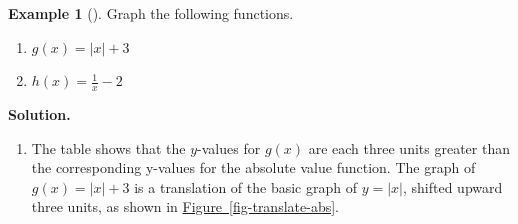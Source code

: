 \documentclass[10pt,]{book}
\theoremstyle{plain}
\theoremstyle{definition}
\theoremstyle{definition}
\theoremstyle{definition}
\newtheorem{example}[theorem]{Example}
\theoremstyle{definition}
\theoremstyle{definition}
\numberwithin{equation}{section}
\newcommand{\hrulethin}  {\noalign{\hrule height 0.04em}}
\newcommand{\hrulethick} {\noalign{\hrule height 0.11em}}
\newcounter{figstack}
\newlength\fight
\newcommand\pushValignCaptionBottom[5][b]{%
\stepcounter{figstack}%
\expandafter\def\csname %
figalign\romannumeral\value{figstack}\endcsname{#1}%
\expandafter\def\csname %
figtype\romannumeral\value{figstack}\endcsname{#2}%
\expandafter\def\csname %
figwd\romannumeral\value{figstack}\endcsname{#3}%
\expandafter\def\csname %
figcontent\romannumeral\value{figstack}\endcsname{#4}%
\expandafter\def\csname %
figcap\romannumeral\value{figstack}\endcsname{#5}%
\setbox0=\hbox{%
\begin{#2}{#3}#4\end{#2}}%
\ifdim\dimexpr\ht0+\dp0\relax>\fight\global\setlength{\fight}{%
\dimexpr\ht0+\dp0\relax}\fi%
}
\newcommand\abs[1]{\left|#1\right|}
\begin{document}
%
\begin{example}[]\label{example-translations}
Graph the following functions.
        \leavevmode%
\begin{enumerate}[label=*\alph**]
\item\hypertarget{li-288}{}\(g(x) = \abs{x} + 3\)\item\hypertarget{li-289}{}\(h(x) = \frac{1}{x}− 2\)\end{enumerate}

\par\medskip\noindent%
\textbf{Solution.}\quad \leavevmode%
\begin{enumerate}[label=*\alph**]
\item\hypertarget{li-290}{}The table shows that the \(y\)-values for \(g(x)\) are each three units greater than the corresponding y-values for the absolute value function. The graph of \(g(x) = \abs{x} + 3\) is a translation of the basic graph of \(y = \abs{x}\), shifted upward three units, as shown in \hyperref[fig-translate-abs]{Figure~\ref{fig-translate-abs}}.
        \leavevmode%
\end{enumerate}
\end{example}
\end{document}
